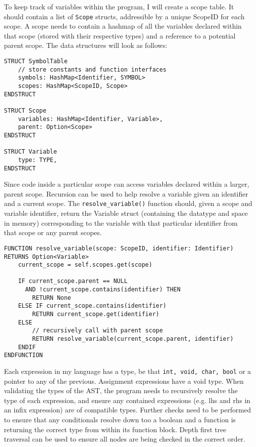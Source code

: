 To keep track of variables within the program, I will create a scope table. It should contain a list of \texttt{Scope} structs, addressible by a unique ScopeID for each scope. A scope needs to contain a hashmap of all the variables declared within that scope (stored with their respective types) and a reference to a potential parent scope. The data structures will look as follows:

\begin{lstlisting}
STRUCT SymbolTable
    // store constants and function interfaces
    symbols: HashMap<Identifier, SYMBOL> 
    scopes: HashMap<ScopeID, Scope>
ENDSTRUCT

STRUCT Scope 
    variables: HashMap<Identifier, Variable>,
    parent: Option<Scope>
ENDSTRUCT

STRUCT Variable 
    type: TYPE,
ENDSTRUCT
\end{lstlisting}

Since code inside a particular scope can access variables declared within a larger, parent scope. Recursion can be used to help resolve a variable given an identifier and a current scope. The \texttt{resolve\_variable()} function should, given a scope and variable identifier, return the Variable struct (containing the datatype and space in memory) corresponding to the variable with that particular identifier from that scope or any parent scopes. 

\begin{lstlisting}
FUNCTION resolve_variable(scope: ScopeID, identifier: Identifier) RETURNS Option<Variable>
    current_scope = self.scopes.get(scope)

    IF current_scope.parent == NULL 
      AND !current_scope.contains(identifier) THEN
        RETURN None
    ELSE IF current_scope.contains(identifier)
        RETURN current_scope.get(identifier)
    ELSE 
        // recursively call with parent scope
        RETURN resolve_variable(current_scope.parent, identifier)
    ENDIF
ENDFUNCTION
\end{lstlisting}

Each expression in my language has a type, be that \texttt{int, void, char, bool} or a pointer to any of the previous. Assignment expressions have a void type. When validating the types of the AST, the program needs to recursively resolve the type of each expression, and ensure any contained expressions (e.g. lhs and rhs in an infix expression) are of compatible types. Further checks need to be performed to ensure that any conditionals resolve down too a boolean and a function is returning the correct type from within its function block. Depth first tree traversal can be used to ensure all nodes are being checked in the correct order.

